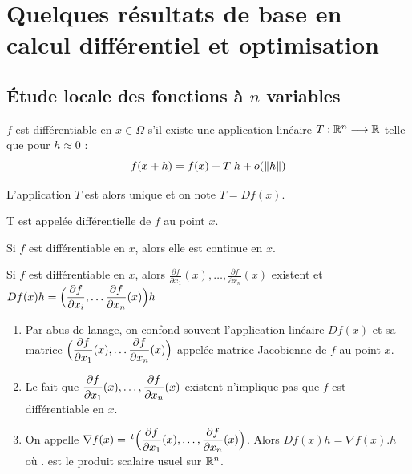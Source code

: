 \section{Quelques résultats de base en calcul différentiel et optimisation}
%
\subsection{Étude locale des fonctions à $n$ variables}

\begin{fdef}
    $f$ est différentiable en $x \in \Omega$ s'il existe une application linéaire 
    $T : \mathbb{R}^n \longrightarrow \mathbb{R}$ telle que pour $h \approx 0$ :
    \[
        f(x+h) = f(x) + T \; h + o(\left\lVert h\right\rVert)
    \]

    L'application $T$ est alors unique et on note $T = Df(x)$.

    T est appelée différentielle de $f$ au point $x$.
\end{fdef}

\begin{remark}
    Si $f$ est différentiable en $x$, alors elle est continue en $x$.
\end{remark}

\begin{lemme}
    Si $f$ est différentiable en $x$, alors $\displaystyle \frac{\partial f}{\partial x_1}(x), \dots , \displaystyle \frac{\partial f}{\partial x_n}(x)$ existent et
    $Df(x)h = \Big( \displaystyle\frac{\partial f}{\partial x_i}, \dots \displaystyle\frac{\partial f}{\partial x_n}(x) \Big) h$
\end{lemme}

\begin{remark}
    \begin{enumerate}
        \item Par abus de lanage, on confond souvent l'application linéaire $Df(x)$ et sa
            matrice $\Big( \displaystyle\frac{\partial f}{\partial x_1}(x), \dots \displaystyle\frac{\partial f}{\partial x_n}(x) \Big)$ appelée
            matrice Jacobienne de $f$ au point $x$.

        \item Le fait que $\displaystyle\frac{\partial f}{\partial x_1} (x), \dots, \displaystyle\frac{\partial f}{\partial x_n}(x)$ existent
            n'implique pas que $f$ est différentiable en $x$.

        \item On appelle $\nabla f(x) = \,^t\Big( \displaystyle\frac{\partial f}{\partial x_1}(x), \dots, \displaystyle\frac{\partial f}{\partial x_n}(x) \Big)$. Alors $Df(x)h = \nabla f(x) . h$ où $.$ est le produit scalaire usuel sur
            $\mathbb{R}^n$.
    \end{enumerate}
\end{remark}

